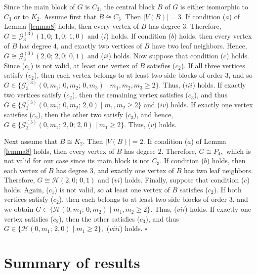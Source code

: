 \documentclass[12pt]{article}
\newcommand{\proof}{\noindent{\bf Proof.\ }}
\newcommand{\qed}{\hfill $\square$ \bigskip}
\begin{document}
\proof 
Since the main block of $G$ is $C_3$, the central block $B$ of $G$ is either isomorphic to $C_3$ or to $K_2$. Assume first that $B\cong C_3$. Then $|V(B)|=3$.
If condition {\rm($a$)} of Lemma \ref{lemma8} holds, then every vertex of $B$ has degree $3$. Therefore,
$G\cong \mathcal{G}_{3}^{(3)}(1,0;\,1,0;\,1,0)$ and {\rm($i$)} holds.
If condition {\rm($b$)} holds, then every vertex of $B$ has degree $4$, and exactly two vertices of $B$ have two leaf neighbors. Hence,
$G\cong \mathcal{G}_{3}^{(3)}(2,0;\,2,0;\,0,1)$ and {\rm($ii$)} holds.
Now suppose that condition {\rm($c$)} holds. Since {\rm($c_1$)} is not valid, at least one vertex of $B$ satisfies {\rm($c_2$)}. If all three vertices satisfy {\rm($c_2$)}, then each vertex belongs to at least two side blocks of order $3$, and so
$G\in \{\mathcal{G}_{3}^{(3)}(0,m_{1};\,0,m_{2};\,0,m_{3}) \mid m_{1},m_{2},m_{3}\ge 2\}$. Thus, {\rm($iii$)} holds.
If exactly two vertices satisfy {\rm($c_2$)}, then the remaining vertex satisfies {\rm($c_3$)}, and thus
$G\in \{\mathcal{G}_{3}^{(3)}(0,m_{1};\,0,m_{2};\,2,0) \mid m_{1},m_{2}\ge 2\}$ and {\rm($iv$)} holds.
If exactly one vertex satisfies {\rm($c_2$)}, then the other two satisfy {\rm($c_3$)}, and hence,
$G\in \{\mathcal{G}_{3}^{(3)}(0,m_{1};\,2,0;\,2,0) \mid m_{1}\ge 2\}.$ Thus, {\rm($v$)} holds.

Next assume that $B\cong K_2$. Then $|V(B)|=2$. If condition {\rm($a$)} of Lemma \ref{lemma8} holds, then every vertex of $B$ has degree $2$. Therefore,
$G\cong P_4,$ which is not valid for our case since its main block is not $C_3$.
If condition {\rm($b$)} holds, then each vertex of $B$ has degree $3$, and exactly one vertex of $B$ has two leaf neighbors. Therefore, 
$G\cong \mathcal{H}(2,0;\,0,1)$ and {\rm($vi$)} holds.
Finally, suppose that condition {\rm($c$)} holds. Again, {\rm($c_1$)} is not valid, so at least one vertex of $B$ satisfies {\rm($c_2$)}. If both vertices satisfy {\rm($c_2$)}, then each belongs to at least two side blocks of order $3$, and we obtain
$G\in \{\mathcal{H}(0,m_{1};\,0,m_{2}) \mid m_{1},m_{2}\ge 2\}.$ Thus, {\rm($vii$)} holds.
If exactly one vertex satisfies {\rm($c_2$)}, then the other satisfies {\rm($c_3$)}, and thus
$G\in \{\mathcal{H}(0,m_{1};\,2,0) \mid m_{1}\ge 2\},$ {\rm($viii$)} holds.
\qed

\section{Summary of results}
\label{sec:mainthm}
\end{document}
